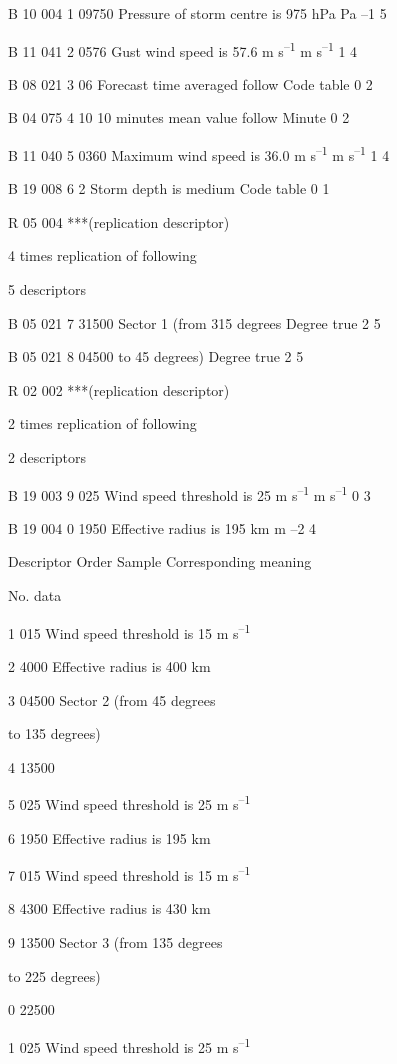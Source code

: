 B 10 004 1 09750 Pressure of storm centre is 975 hPa Pa --1 5

B 11 041 2 0576 Gust wind speed is 57.6 m s\textsuperscript{--1} m s\textsuperscript{--1} 1 4

B 08 021 3 06 Forecast time averaged follow Code table 0 2

B 04 075 4 10 10 minutes mean value follow Minute 0 2

B 11 040 5 0360 Maximum wind speed is 36.0 m s\textsuperscript{--1} m s\textsuperscript{--1} 1 4

B 19 008 6 2 Storm depth is medium Code table 0 1

R 05 004 ***(replication descriptor)

4 times replication of following

5 descriptors

B 05 021 7 31500 Sector 1 (from 315 degrees Degree true 2 5

B 05 021 8 04500 to 45 degrees) Degree true 2 5

R 02 002 ***(replication descriptor)

2 times replication of following

2 descriptors

B 19 003 9 025 Wind speed threshold is 25 m s\textsuperscript{--1} m s\textsuperscript{--1} 0 3

B 19 004 0 1950 Effective radius is 195 km m --2 4

Descriptor Order Sample Corresponding meaning

No. data

1 015 Wind speed threshold is 15 m s\textsuperscript{--1}

2 4000 Effective radius is 400 km

3 04500 Sector 2 (from 45 degrees

to 135 degrees)

4 13500

5 025 Wind speed threshold is 25 m s\textsuperscript{--1}

6 1950 Effective radius is 195 km

7 015 Wind speed threshold is 15 m s\textsuperscript{--1}

8 4300 Effective radius is 430 km

9 13500 Sector 3 (from 135 degrees

to 225 degrees)

0 22500

1 025 Wind speed threshold is 25 m s\textsuperscript{--1}

